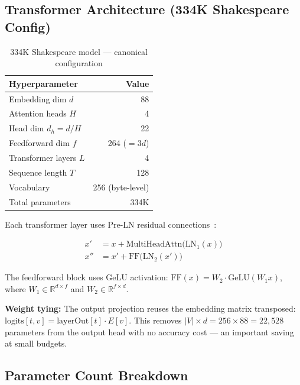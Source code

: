 \documentclass[11pt]{article}
\begin{document}
\subsection{Transformer Architecture (334K Shakespeare Config)}

\begin{table}[ht]
\centering
\begin{tabular}{lr}
\toprule
Hyperparameter & Value \\
\midrule
Embedding dim $d$ & 88 \\
Attention heads $H$ & 4 \\
Head dim $d_h = d/H$ & 22 \\
Feedforward dim $f$ & 264 ($= 3d$) \\
Transformer layers $L$ & 4 \\
Sequence length $T$ & 128 \\
Vocabulary & 256 (byte-level) \\
\midrule
Total parameters & 334K \\
\bottomrule
\end{tabular}
\caption{334K Shakespeare model — canonical configuration}
\label{tab:arch}
\end{table}

Each transformer layer uses Pre-LN residual connections~\cite{xiong2020layer}:

\begin{align}
x' &= x + \text{MultiHeadAttn}\bigl(\text{LN}_1(x)\bigr) \\
x'' &= x' + \text{FF}\bigl(\text{LN}_2(x')\bigr)
\end{align}

The feedforward block uses GeLU activation:
$\text{FF}(x) = W_2 \cdot \text{GeLU}(W_1 x)$, where $W_1 \in \mathbb{R}^{d \times f}$
and $W_2 \in \mathbb{R}^{f \times d}$.

\textbf{Weight tying:} The output projection reuses the embedding matrix transposed:
$\text{logits}[t, v] = \text{layerOut}[t] \cdot E[v]$.
This removes $|V| \times d = 256 \times 88 = 22{,}528$ parameters from the output head
with no accuracy cost --- an important saving at small budgets.

\subsection{Parameter Count Breakdown}
\end{document}
